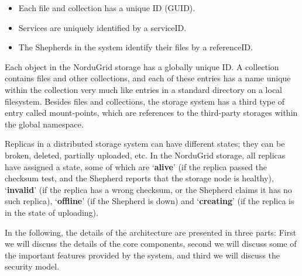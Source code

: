\documentclass{llncs}
\begin{document}
\begin{itemize} 
\item Each  file and collection has a unique ID (GUID).
\item Services are uniquely identified by a serviceID. 
\item The Shepherds in the system identify their files by a referenceID.
\end{itemize} 

Each object in the NorduGrid storage has a globally
unique ID. A collection contains files and other collections,
and each of these entries has a name unique within the collection very
much like entries in a standard directory on a local filesystem. Besides
files and collections, the storage system has a third type of entry
called mount-points, which are references to the third-party storages
within the global namespace.

Replicas in a distributed storage system can have different states;
they can be broken, deleted, partially uploaded, etc. In the
NorduGrid storage, all replicas have assigned a state, some of which are
`\textbf{alive}' (if the replica passed the checksum test, and the
Shepherd reports that the storage node is healthy), `\textbf{invalid}'
(if the replica has a wrong checksum, or the Shepherd claims it has no
such replica), `\textbf{offline}' (if the Shepherd is down) and `\textbf{creating}' (if the replica is in
the state of uploading).

In the following, the details of the
architecture are presented in three parts: First we will discuss the
details of the core components, second we will discuss some of the
important features provided by the system, and third we will discuss the security model.
\end{document}
